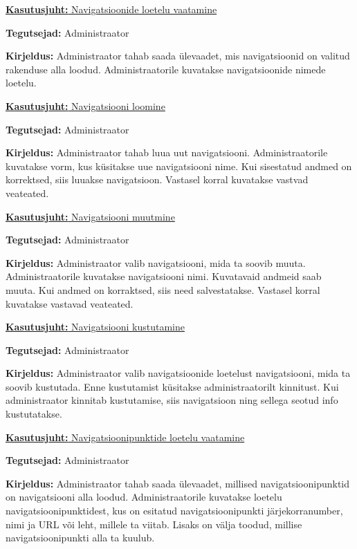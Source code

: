 \documentclass[a4paper,12pt]{article} %
\begin{document}
\underline{\textbf{Kasutusjuht:} Navigatsioonide loetelu vaatamine}
\par
\textbf{Tegutsejad:} Administraator
\par
\textbf{Kirjeldus:} Administraator tahab saada ülevaadet, mis navigatsioonid on valitud rakenduse alla loodud. Administraatorile kuvatakse navigatsioonide nimede loetelu.
\par

\underline{\textbf{Kasutusjuht:} Navigatsiooni loomine}
\par
\textbf{Tegutsejad:} Administraator
\par
\textbf{Kirjeldus:} Administraator tahab luua uut navigatsiooni. Administraatorile kuvatakse vorm, kus küsitakse uue navigatsiooni nime. Kui sisestatud andmed on korrektsed, siis luuakse navigatsioon. Vastasel korral kuvatakse vastvad veateated.
\par

\underline{\textbf{Kasutusjuht:} Navigatsiooni muutmine}
\par
\textbf{Tegutsejad:} Administraator
\par
\textbf{Kirjeldus:} Administraator valib navigatsiooni, mida ta soovib muuta. Administraatorile kuvatakse navigatsiooni nimi. Kuvatavaid andmeid saab muuta. Kui andmed on korraktsed, siis need salvestatakse. Vastasel korral kuvatakse vastavad veateated.
\par

\underline{\textbf{Kasutusjuht:} Navigatsiooni kustutamine}
\par
\textbf{Tegutsejad:} Administraator
\par
\textbf{Kirjeldus:} Administraator valib navigatsioonide loetelust navigatsiooni, mida ta soovib kustutada. Enne kustutamist küsitakse administraatorilt kinnitust. Kui administraator kinnitab kustutamise, siis navigatsioon ning sellega seotud info kustutatakse.
\par

\underline{\textbf{Kasutusjuht:} Navigatsioonipunktide loetelu vaatamine}
\par
\textbf{Tegutsejad:} Administraator
\par
\textbf{Kirjeldus:} Administraator tahab saada ülevaadet, millised navigatsioonipunktid on navigatsiooni alla loodud. Administraatorile kuvatakse loetelu navigatsioonipunktidest, kus on esitatud navigatsioonipunkti järjekorranumber, nimi ja URL või leht, millele ta viitab. Lisaks on välja toodud, millise navigatsioonipunkti alla ta kuulub.
\par
\end{document}
